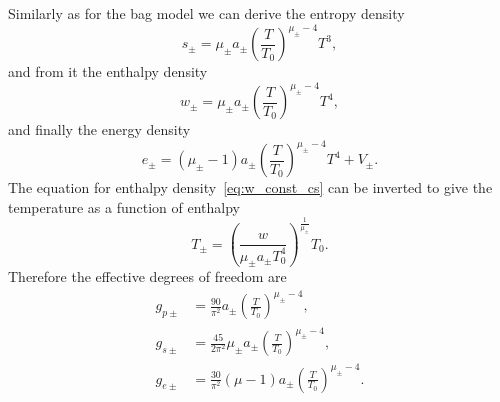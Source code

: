 Similarly as for the bag model we can derive the entropy density
\begin{equation}
s_\pm = \mu_\pm a_\pm \left( \frac{T}{T_0} \right)^{\mu_\pm - 4} T^3,
\end{equation}
and from it the enthalpy density
\begin{equation}
w_\pm = \mu_\pm a_\pm \left( \frac{T}{T_0} \right)^{\mu_\pm - 4} T^4,
\label{eq:w_const_cs}
\end{equation}
and finally the energy density
\begin{equation}
e_\pm = (\mu_\pm - 1) a_\pm \left( \frac{T}{T_0} \right)^{\mu_\pm - 4} T^4 + V_\pm.
\end{equation}
The equation for enthalpy density~\eqref{eq:w_const_cs} can be inverted to give the temperature as a function of enthalpy
\begin{equation}
T_\pm = \left( \frac{w}{\mu_\pm a_\pm T_0^4} \right)^\frac{1}{\mu_\pm} T_0.
\end{equation}
Therefore the effective degrees of freedom are
\begin{align}
g_{p\pm} &= \frac{90}{\pi^2} a_\pm \left( \frac{T}{T_0} \right)^{\mu_\pm - 4}, \\
g_{s\pm} &= \frac{45}{2\pi^2} \mu_\pm a_\pm \left( \frac{T}{T_0} \right)^{\mu_\pm - 4}, \\
g_{e\pm} &= \frac{30}{\pi^2} (\mu - 1) a_\pm \left( \frac{T}{T_0} \right)^{\mu_\pm - 4}.
\end{align}


